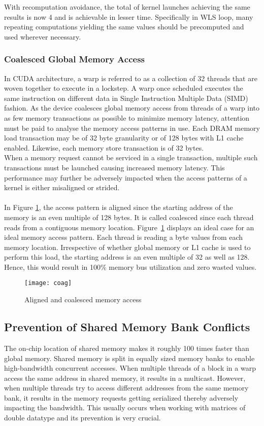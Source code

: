 \documentclass[thesis.tex]{subfiles}
\begin{document}
With recomputation avoidance, the total of kernel launches achieving the same results is now 4 and is achievable in lesser time. Specifically in WLS loop, many repeating computations yielding the same values should be precomputed and used wherever necessary. 
\subsubsection{Coalesced Global Memory Access}
In CUDA architecture, a warp is referred to as a collection of 32 threads that are woven together to execute in a lockstep. A warp once scheduled executes the same instruction on different data in Single Instruction Multiple Data (SIMD) fashion. As the device coalesces global memory access from threads of a warp into as few memory transactions as possible to minimize memory latency, attention must be paid to analyse the memory access patterns in use. Each DRAM memory load transaction may be of 32 byte granularity or of 128 bytes with L1 cache enabled. Likewise, each memory store transaction is of 32 bytes.\\
When a memory request cannot be serviced in a single transaction, multiple such transactions must be launched causing increased memory latency. This performance may further be adversely impacted when the access patterns of a kernel is either misaligned or strided. \\\\
In Figure \ref{fig:coag}, the access pattern is aligned since the starting address of the memory is an even multiple of 128 bytes. 
It is called coalesced since each thread reads from a contiguous memory location. Figure~\ref{fig:coag} displays an ideal case for an ideal memory access pattern. Each thread is reading a byte values from each memory location. Irrespective of whether global memory or L1 cache is used to perform this load, the starting address is an even multiple of 32 as well as 128. Hence, this would result in 100\% memory bus utilization and zero wasted values.

\begin{figure}[H]
	\centering
	\texttt{[image: coag]}
	\caption{Aligned and coalesced memory access}
	\label{fig:coag}
\end{figure}

\subsection{Prevention of Shared Memory Bank Conflicts}
The on-chip location of shared memory makes it roughly 100 times faster than global memory. Shared memory is split in equally sized memory banks to enable high-bandwidth concurrent accesses. When multiple threads of a block in a warp access the same address in shared memory, it results in a multicast. However, when multiple threads try to access different addresses from the same memory bank, it results in the memory requests getting serialized thereby adversely impacting the bandwidth. 
This usually occurs when working with matrices of double datatype and its prevention is very crucial. 
\end{document}
